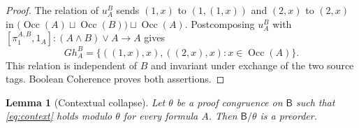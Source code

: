 \documentclass[11pt]{article}
\newtheorem{lemma}[theorem]{Lemma}
\newcommand{\B}{\mathsf B}
\newcommand{\Occ}{\operatorname{Occ}}
\begin{document}
\begin{proof}
The relation of $u_A^B$ sends $(1,x)$ to $(1,(1,x))$ and $(2,x)$
to $(2,x)$ in $\bigl(\Occ(A)\sqcup\Occ(B)\bigr)\sqcup\Occ(A)$.
Postcomposing $u_A^B$ with
$[\pi_1^{A,B},1_A]:(A\wedge B)\vee A\to A$ gives
\[
 Gh_A^B=\{((1,x),x),((2,x),x):x\in\Occ(A)\}.
\]
This relation is independent of $B$ and invariant under exchange of
the two source tags. Boolean Coherence proves both assertions.
\end{proof}

\begin{lemma}[Contextual collapse]\label{lem:collapse}
Let $\theta$ be a proof congruence on $\B$ such that
\eqref{eq:context} holds modulo $\theta$ for every formula $A$.
Then $\B/\theta$ is a preorder.
\end{lemma}
\end{document}
